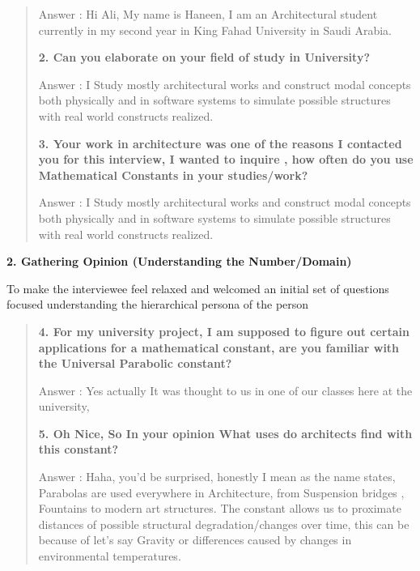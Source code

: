\begin{enumerate}
\begin{flushleft}
\begin{quote}
    Answer : Hi Ali, My name is Haneen, I am an Architectural student currently in my second year in King Fahad University in Saudi Arabia.  
    \hfill \break
   
    \textbf{2. Can you elaborate on your field of study in University?}
    
    Answer : I Study mostly architectural works and construct modal concepts both physically and in software systems to simulate possible structures with real world constructs realized.
    \hfill \break 
    
    \textbf{3. Your work in architecture was one of the reasons I contacted you for this interview, I wanted to inquire , how often do you use Mathematical Constants in your studies/work? }
    
    Answer : I Study mostly architectural works and construct modal concepts both physically and in software systems to simulate possible structures with real world constructs realized.
    \hfill \break
    \end{quote} 
    
    
    
    \textbf{2. Gathering Opinion (Understanding the Number/Domain)}

    To make the interviewee feel relaxed and welcomed an initial set of questions focused understanding the hierarchical persona of the person  \hfill \break

    \begin{quote}
    \textbf{4. For my university project, I am supposed to figure out certain applications for a mathematical constant, are you familiar with the Universal Parabolic constant?}
    
    Answer : Yes actually It was thought to us in one of our classes here at the university, \hfill \break
   \linebreak
   
    \textbf{5. Oh Nice, So In your opinion What uses do architects find with this constant? }
    
    Answer : Haha, you'd be surprised, honestly I mean as the name states, Parabolas are used everywhere in Architecture, from Suspension bridges , Fountains  to modern art structures. The constant allows us to proximate distances of possible structural degradation/changes over time, this can be because of let's say Gravity or  differences caused by changes in environmental temperatures. \hfill \break
    \end {quote}
    

\end{flushleft}
\end{enumerate}
